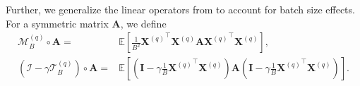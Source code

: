 \documentclass[11pt, letterpaper]{article}
\begin{document}
Further, we generalize the linear operators from \citet{zou2023benign} to account for batch size effects. For a symmetric matrix $\mathbf{A}$, we define
\begin{equation*}
    \begin{aligned}
        \mathcal{M}_B^{(q)}\circ\mathbf{A}=&\mathbb{E}\left[\frac{1}{B^2} {\mathbf{X}^{(q)}}^\top{\mathbf{X}^{(q)}} \mathbf{A} {\mathbf{X}^{(q)}}^\top{\mathbf{X}^{(q)}} \right],\\
        (\mathcal{I}-\gamma\mathcal{T}_B^{(q)})\circ\mathbf{A}=&\mathbb{E}\left[\left(\mathbf{I}-\gamma\frac{1}{B} {\mathbf{X}^{(q)}}^\top{\mathbf{X}^{(q)}}\right)\mathbf{A}\left(\mathbf{I}-\gamma\frac{1}{B} {\mathbf{X}^{(q)}}^\top{\mathbf{X}^{(q)}}\right)\right].
    \end{aligned}
\end{equation*}
\end{document}
